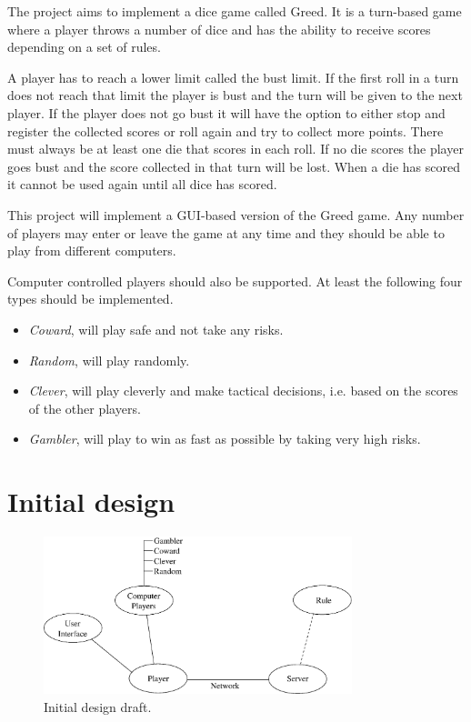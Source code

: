 \documentclass[10pt, titlepage, oneside, a4paper]{article}
\begin{document}
	The project aims to implement a dice game called Greed. It is a turn-based game where a player throws a number of dice and has the ability to receive scores depending on a set of rules.

	A player has to reach a lower limit called the bust limit. If the first roll in a turn does not reach that limit the player is bust and the turn will be given to the next player. If the player does not go bust it will have the option to either stop and register the collected scores or roll again and try to collect more points. There must always be at least one die that scores in each roll. If no die scores the player goes bust and the score collected in that turn will be lost. When a die has scored it cannot be used again until all dice has scored.

	This project will implement a GUI-based version of the Greed game. Any number of players may enter or leave the game at any time and they should be able to play from different computers.

	Computer controlled players should also be supported. At least the following four types should be implemented.

	\begin{itemize}
	\item \emph{Coward}, will play safe and not take any risks.
	\item \emph{Random}, will play randomly.
	\item \emph{Clever}, will play cleverly and make tactical decisions, i.e. based on the scores of the other players.
	\item \emph{Gambler}, will play to win as fast as possible by taking very high risks.
	\end{itemize}

	\section{Initial design}
	
	\begin{figure}[t]
		\centering
			\includegraphics[width=0.8\textwidth]{design.eps}
		\caption{Initial design draft.}
		\label{fig:design}
	\end{figure}
	
\end{document}
